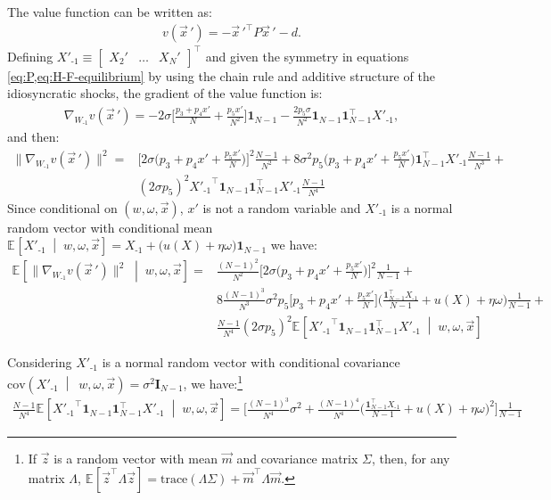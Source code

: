 \documentclass[12pt]{article}
\newcommand{\condexpec}[3][]{\ensuremath{\mathbb{E}_{#1}\left[{#2} \; \middle| \; {#3} \right]}}
\newcommand{\condcov}[2]{\ensuremath{\mathrm{cov}\left({#1} \; \middle| \; {#2} \right)}}
\newcommand{\expec}[2][]{\ensuremath{\mathbb{E}_{{#1}}\left[ {#2} \right]}}
\begin{document}
The value function can be written as: 
\begin{align}
v(\vec{x}\,') = - \vec{x}\,'^\top P \vec{x}\,' - d.
\end{align}
 Defining $X'_{\text{-}1} \equiv \begin{bmatrix}X_2' & \ldots & X_N' \end{bmatrix}^{\top}$ and given the symmetry in equations \cref{eq:P,eq:H-F-equilibrium} by using the chain rule and additive structure of the idiosyncratic shocks, the gradient of the value function is:
\begin{align*}
\nabla_{{W_{\text{-}1}}}v(\vec{x}\,') = - 2 \sigma\Big[ \frac{p_3+p_4 x'}{N} + \frac{p_5 x'}{N^2}\Big] \mathbf{1}_{N-1}- \frac{2 p_5 \sigma}{N^2} \mathbf{1}_{N-1}\mathbf{1}_{N-1}^{\top} X'_{\text{-}1},
\end{align*}
and then:
\begin{align*}
\|\nabla_{{W_{\text{-}1}}}v(\vec{x}\,')\|^2 = & \Big[2\sigma \big(p_3+p_4x'+\frac{p_5x'}{N}\big)\Big]^2  \frac{N-1}{N^2} + 8 \sigma^2 p_5 \big(p_3+p_4x' +\frac{p_5 x'}{N}\big) \mathbf{1}_{N-1}^\top X'_{\text{-}1} \frac{N-1}{N^3}+\\
& (2\sigma p_5)^2 {X'_{\text{-}1}}^\top \mathbf{1}_{N-1}\mathbf{1}_{N-1}^\top X'_{\text{-}1}\frac{N-1}{N^4}
\end{align*}
Since conditional on $(w,\omega, \vec{x})$, $x'$ is not a random variable and $X'_{\text{-}1}$ is a normal random vector with conditional mean $\condexpec{X'_{\text{-}1}}{w,\omega,\vec{x}} = X_{\text{-}1} + \big(u(X)+\eta \omega \big)\mathbf{1}_{N-1}$  we have:
\begin{align*}
\condexpec{\|\nabla_{{W_{\text{-}1}}}v(\vec{x}\,')\|^2}{w,\omega,\vec{x}} =&  \frac{(N-1)^2}{N^2} \Big[ 2\sigma\big(p_3+ p_4x'+\frac{p_5x'}{N} \big) \Big]^2 \frac{1}{N-1} + \\
  & 8 \frac{(N-1)^3}{N^3}\sigma^2 p_5 \Big[p_3+ p_4 x' + \frac{p_5 x'}{N}\Big] \Big(\frac{\mathbf{1}_{N-1}^\top X_{\text{-}1}}{N-1}+ u(X)+\eta \omega\Big) \frac{1}{N-1} + \\
  & \frac{N-1}{N^4} (2\sigma p_5)^2 \condexpec{{X'_{\text{-}1}}^\top \mathbf{1}_{N-1}\mathbf{1}_{N-1}^\top X'_{\text{-}1}}{w,\omega,\vec{x}}
\end{align*}
	 
 Considering $X'_{\text{-}1}$ is a normal random vector with conditional covariance $\condcov{X'_{\text{-}1}}{~w,\omega, \vec{x}} = \sigma^2 \mathbf{I}_{N-1}$, we have:\footnote{If $\vec{z}$ is a random vector with mean $\vec{m}$ and covariance matrix $\Sigma$, then, for any matrix $\Lambda$, $\expec{\vec{z}^\top \Lambda \vec{z}}=\text{trace}(\Lambda\Sigma)+\vec{m}^\top \Lambda \vec{m}$.}
\begin{align*}
 \frac{N-1}{N^4} \condexpec{{X'_{\text{-}1}}^\top \mathbf{1}_{N-1}\mathbf{1}_{N-1}^\top X'_{\text{-}1}}{w,\omega,\vec{x}} =  \Big[ \frac{(N-1)^3}{N^4}\sigma^2 + \frac{(N-1)^4}{N^4}\big(\frac{\mathbf{1}_{N-1}^\top X_{\text{-}1}}{N-1} + u(X)+ \eta \omega \big)^2 \Big]\frac{1}{N-1}
\end{align*}
\end{document}
